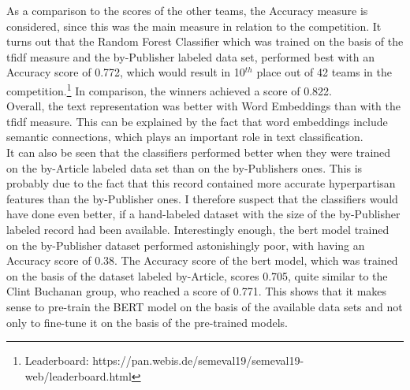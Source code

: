 \documentclass[a4paper, 11pt,titlepage,oneside,openany]{book}
\begin{document}
\indent As a comparison to the scores of the other teams, the Accuracy measure is considered, since this was the main measure in relation to the competition. It turns out that the Random Forest Classifier which was trained on the basis of  the \gls{tfidf} measure and the by-Publisher labeled data set, performed best with an Accuracy score of 0.772, which would result in 10$^{th}$ place out of 42 teams in the competition.\footnote{Leaderboard: https://pan.webis.de/semeval19/semeval19-web/leaderboard.html} In comparison, the winners achieved a score of 0.822.\\
\indent Overall, the text representation was better with Word Embeddings than with the \gls{tfidf} measure. This can be explained by the fact that word embeddings include semantic connections, which plays an important role in text classification. \\
\indent It can also be seen that the classifiers performed better when they were trained on the by-Article labeled data set than on the by-Publishers ones. This is probably due to the fact that this record contained more accurate hyperpartisan features than the by-Publisher ones. I therefore suspect that the classifiers would have done even better, if a hand-labeled dataset with the size of the by-Publisher labeled record had been available. 
\newpage
\indent Interestingly enough, the \gls{bert} model trained on the by-Publisher dataset performed astonishingly poor, with having an Accuracy score of 0.38. The Accuracy score of the \gls{bert} model, which was trained on the basis of the dataset labeled by-Article, scores 0.705, quite similar to the Clint Buchanan group, who reached a score of 0.771. This shows that it makes sense to pre-train the BERT model on the basis of the available data sets and not only to fine-tune it on the basis of the pre-trained models. 
\end{document}
